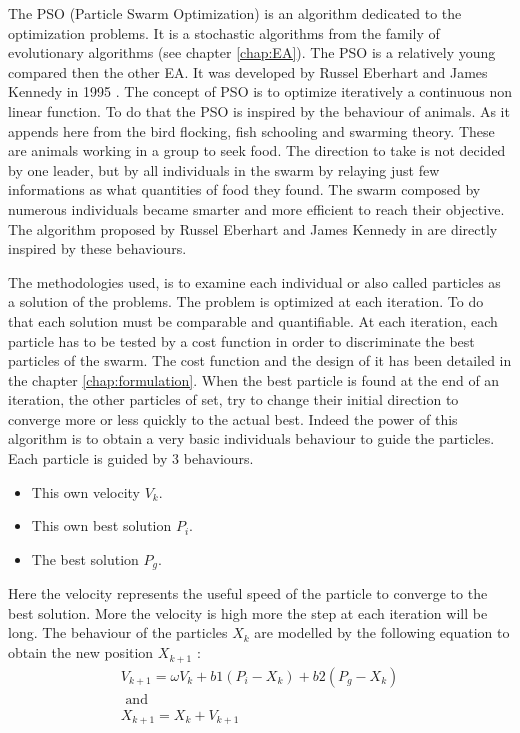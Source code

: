 The PSO (Particle Swarm Optimization) is an algorithm dedicated to the optimization problems. It is a stochastic algorithms from the family of evolutionary algorithms (see chapter \ref{chap:EA}). 
The PSO is a relatively young compared then the other EA. It was developed by Russel Eberhart and James Kennedy in 1995 \cite{148*eberhart1995}. The concept of PSO is to optimize iteratively a continuous non linear function. To do that the PSO is inspired by the behaviour of animals. As it appends here from the bird flocking, fish schooling and swarming theory. These are animals working in a group to seek food. 
The direction to take is not decided by one leader, but by all individuals in the swarm by relaying just few informations as what quantities of food they found. 
The swarm composed by numerous individuals became smarter and more efficient to reach their objective. 
The algorithm proposed by Russel Eberhart and James Kennedy in  \cite{148*eberhart1995} are directly inspired by these behaviours.

The methodologies used, is to examine each individual or also called particles as a solution of the problems. The problem is optimized at each iteration. To do that each solution must be comparable and quantifiable. At each iteration, each particle has to be tested by a cost function in order to discriminate the best particles of the swarm. The cost function and the design of it has been detailed in the chapter \ref{chap:formulation}.
When the best particle is found at the end of an iteration, the other particles of set, try to change their initial direction to converge more or less quickly to the actual best. 
Indeed the power of this algorithm is to obtain a very basic individuals behaviour to guide the particles. 
Each particle is guided by 3 behaviours.
 \begin{itemize}
 \item  This own velocity $V_k$. 
 \item  This own best solution $P_i$.
 \item  The best solution $P_g$.
\end{itemize}  
Here the velocity represents the useful speed of the particle to converge to the best solution. More the velocity is high more the step at each iteration will be long. 
The behaviour of the particles $X_k$ are modelled by the following equation to obtain the new position $X_{k+1}$ :
\begin{equation} \label{eq:PSO}
\begin{split}
 V_{k+1}= \omega V_k +b1(P_i -X_k)+b2(P_g-X_k)
\\
\mbox{ and } \\ X_{k+1}=X_k+V_{k+1}
\end{split}
\end{equation}

